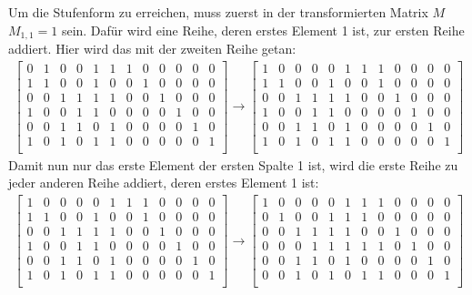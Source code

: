 \documentclass[a4paper,10pt,ngerman]{scrartcl}
\begin{document}
Um die Stufenform zu erreichen, muss zuerst in der transformierten Matrix $M$ $M_{1,1} = 1$ sein. Dafür wird eine Reihe, deren erstes Element 1 ist, zur ersten Reihe addiert. Hier wird das mit der zweiten Reihe getan:
\begin{align*}
\left[ \begin{array}{cccccc|cccccc}
0 & 1 & 0 & 0 & 1 & 1 & 1 & 0 & 0 & 0 & 0 & 0 \\
1 & 1 & 0 & 0 & 1 & 0 & 0 & 1 & 0 & 0 & 0 & 0 \\
0 & 0 & 1 & 1 & 1 & 1 & 0 & 0 & 1 & 0 & 0 & 0 \\
1 & 0 & 0 & 1 & 1 & 0 & 0 & 0 & 0 & 1 & 0 & 0 \\
0 & 0 & 1 & 1 & 0 & 1 & 0 & 0 & 0 & 0 & 1 & 0 \\
1 & 0 & 1 & 0 & 1 & 1 & 0 & 0 & 0 & 0 & 0 & 1 \\
\end{array} \right] 
\rightarrow \left[ \begin{array}{cccccc|cccccc}
1 & 0 & 0 & 0 & 0 & 1 & 1 & 1 & 0 & 0 & 0 & 0 \\
1 & 1 & 0 & 0 & 1 & 0 & 0 & 1 & 0 & 0 & 0 & 0 \\
0 & 0 & 1 & 1 & 1 & 1 & 0 & 0 & 1 & 0 & 0 & 0 \\
1 & 0 & 0 & 1 & 1 & 0 & 0 & 0 & 0 & 1 & 0 & 0 \\
0 & 0 & 1 & 1 & 0 & 1 & 0 & 0 & 0 & 0 & 1 & 0 \\
1 & 0 & 1 & 0 & 1 & 1 & 0 & 0 & 0 & 0 & 0 & 1 \\
\end{array} \right]
\end{align*}
Damit nun nur das erste Element der ersten Spalte 1 ist, wird die erste Reihe zu jeder anderen Reihe addiert, deren erstes Element 1 ist:
\begin{align*}
\left[ \begin{array}{cccccc|cccccc}
1 & 0 & 0 & 0 & 0 & 1 & 1 & 1 & 0 & 0 & 0 & 0 \\
1 & 1 & 0 & 0 & 1 & 0 & 0 & 1 & 0 & 0 & 0 & 0 \\
0 & 0 & 1 & 1 & 1 & 1 & 0 & 0 & 1 & 0 & 0 & 0 \\
1 & 0 & 0 & 1 & 1 & 0 & 0 & 0 & 0 & 1 & 0 & 0 \\
0 & 0 & 1 & 1 & 0 & 1 & 0 & 0 & 0 & 0 & 1 & 0 \\
1 & 0 & 1 & 0 & 1 & 1 & 0 & 0 & 0 & 0 & 0 & 1 \\
\end{array} \right]
\rightarrow \left[ \begin{array}{cccccc|cccccc}
1 & 0 & 0 & 0 & 0 & 1 & 1 & 1 & 0 & 0 & 0 & 0 \\
0 & 1 & 0 & 0 & 1 & 1 & 1 & 0 & 0 & 0 & 0 & 0 \\
0 & 0 & 1 & 1 & 1 & 1 & 0 & 0 & 1 & 0 & 0 & 0 \\
0 & 0 & 0 & 1 & 1 & 1 & 1 & 1 & 0 & 1 & 0 & 0 \\
0 & 0 & 1 & 1 & 0 & 1 & 0 & 0 & 0 & 0 & 1 & 0 \\
0 & 0 & 1 & 0 & 1 & 0 & 1 & 1 & 0 & 0 & 0 & 1 \\
\end{array} \right]
\end{align*}
\end{document}
